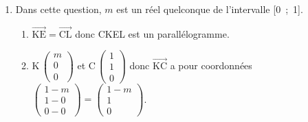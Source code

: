 \documentclass[10pt]{article}
\providecommand{\vectt}[1]{\overrightarrow{\mathrm{#1}}}
\begin{document}
\begin{enumerate}[resume]
\item Dans cette question, $m$ est un réel quelconque de l'intervalle [0~;~1].
	\begin{enumerate}
		\item 
{}		

$\vectt{KE} = \vectt{CL}$ donc CKEL est un parallélogramme.
		
		\item
K\,$\begin{pmatrix} m\\0\\0 \end{pmatrix}$ et
C\,$\begin{pmatrix} 1\\1\\0 \end{pmatrix}$
donc $\vectt{KC}$ a pour coordonnées
$\begin{pmatrix} 1-m\\1-0\\0-0 \end{pmatrix} = \begin{pmatrix} 1-m\\1\\0 \end{pmatrix}$.


\end{enumerate}
\end{enumerate}
\end{document}
